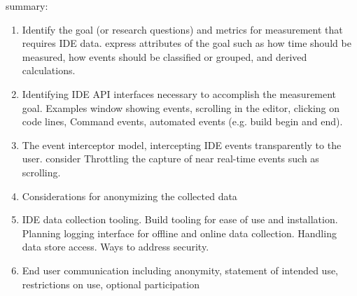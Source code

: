  summary:
\begin{enumerate}
	\item 
	Identify the goal (or research questions) and metrics for measurement that requires IDE data.  express attributes of the goal such as how time should be measured, how events should be classified or grouped, and derived calculations.
	\item
	Identifying  IDE API interfaces necessary to accomplish the measurement goal.  Examples window showing events, scrolling in the editor, clicking on code lines, Command events, automated events (e.g. build begin and end).
	\item
	The event interceptor model, intercepting IDE events transparently to the user.  consider Throttling the capture of near real-time events such as scrolling.
	\item
	Considerations for anonymizing the collected data
	\item
	IDE data collection tooling.  Build tooling for ease of use and installation.  Planning logging interface for offline and online data collection.  Handling data store access.  Ways to address security.  
	\item
	End user communication including anonymity, statement of intended use, restrictions on use, optional participation
	
\end{enumerate}
